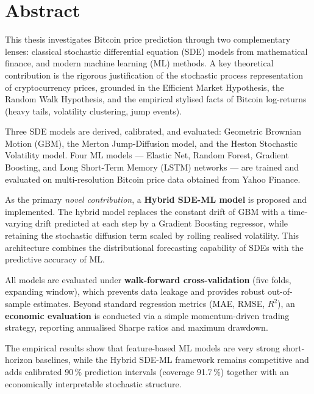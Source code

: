 \documentclass[12pt, a4paper, oneside]{report}
\theoremstyle{plain}
\theoremstyle{definition}
\theoremstyle{remark}
\begin{document}
\setcounter{page}{2}

\clearpage
\chapter*{Abstract}

This thesis investigates Bitcoin price prediction through two complementary
lenses: classical stochastic differential equation (SDE) models from
mathematical finance, and modern machine learning (ML) methods.  A key
theoretical contribution is the rigorous justification of the stochastic
process representation of cryptocurrency prices, grounded in the Efficient
Market Hypothesis, the Random Walk Hypothesis, and the empirical stylised
facts of Bitcoin log-returns (heavy tails, volatility clustering, jump events).

Three SDE models are derived, calibrated, and evaluated: Geometric Brownian
Motion (GBM), the Merton Jump-Diffusion model, and the Heston Stochastic
Volatility model.  Four ML models --- Elastic Net, Random Forest, Gradient
Boosting, and Long Short-Term Memory (LSTM) networks --- are trained and
evaluated on multi-resolution Bitcoin price data obtained from Yahoo Finance.

As the primary \emph{novel contribution}, a \textbf{Hybrid SDE-ML model} is
proposed and implemented.  The hybrid model replaces the constant drift of GBM
with a time-varying drift predicted at each step by a Gradient Boosting
regressor, while retaining the stochastic diffusion term scaled by rolling
realised volatility.  This architecture combines the distributional forecasting
capability of SDEs with the predictive accuracy of ML.

All models are evaluated under \textbf{walk-forward cross-validation} (five
folds, expanding window), which prevents data leakage and provides robust
out-of-sample estimates.  Beyond standard regression metrics (MAE, RMSE,
$R^2$), an \textbf{economic evaluation} is conducted via a simple
momentum-driven trading strategy, reporting annualised Sharpe ratios and
maximum drawdown.

The empirical results show that feature-based ML models are very strong
short-horizon baselines, while the Hybrid SDE-ML framework remains competitive
and adds calibrated 90\,\% prediction intervals (coverage 91.7\,\%) together
with an economically interpretable stochastic structure.
\end{document}
